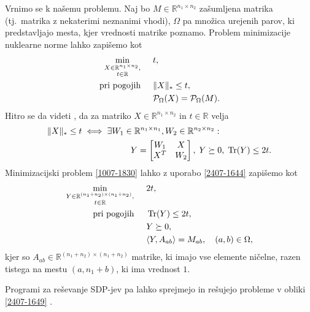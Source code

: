 Vrnimo se k našemu problemu. Naj bo $M \in \mathbb{R}^{n_1 \times n_2}$ zašumljena matrika (tj.\ matrika z nekaterimi neznanimi vhodi), $\Omega$ pa množica urejenih parov, ki predstavljajo mesta, kjer vrednosti matrike poznamo.
Problem minimizacije nuklearne norme lahko zapišemo kot
\begin{align}
\label{1007-1830}
\begin{split}
    \min_{\substack{X\in \mathbb R^{n_1\times n_2},\\ t\in \mathbb R}} \hspace{0.5cm}        & t,                                               \\
    \text{pri pogojih} \hspace{0.5cm} & \lVert X\rVert_* \leq t,  \\
                                      & \mathcal{P}_\Omega(X) = \mathcal{P}_\Omega(M).
\end{split}
\end{align}
Hitro se da videti \cite[lema 2]{NNM-PHD}, da za matriko $X \in \mathbb{R}^{n_1 \times n_2}$ in $t \in \mathbb{R}$
velja 
\begin{align}
\label{2407-1644}
\begin{split}
\lVert X\rVert_* \leq t &\iff \exists W_1\in \mathbb{R}^{n_1 \times n_1}, W_2 \in \mathbb{R}^{n_2 \times n_2}:\\
&\hspace{2cm}
Y = \begin{bmatrix}
               W_1 & X                     \\
               X^T & W_2 
           \end{bmatrix},\;       Y \succeq 0,\; \operatorname{Tr}(Y) \leq 2t.
\end{split}
\end{align}
Minimizacijski problem \eqref{1007-1830} lahko z uporabo \eqref{2407-1644} zapišemo kot
\begin{align}
\label{2407-1649}
\begin{split}
    \min_{\substack{Y\in \mathbb R^{(n_1+n_2)\times (n_1+n_2)},\\ t\in \mathbb R}}     \hspace{0.5cm} & 2t,                        \\
    \text{pri pogojih} \hspace{0.5cm} & \operatorname{Tr}(Y) \leq 2t,           \\
                                  & Y \succeq 0,              \\
                                  & \langle Y, A_{ab} \rangle = M_{ab},\quad (a,b)\in \Omega,
\end{split}
\end{align}
kjer so $A_{ab} \in \mathbb{R}^{(n_1 + n_2) \times (n_1 + n_2)}$ matrike, ki imajo vse elemente ničelne, razen tistega na mestu $(a, n_1 + b)$, ki ima vrednost $1$.
\iffalse
Ker velja
\[
    \trOp{A}{B} = \sum_{i}^{n_1} \sum_{j}^{n_2} a_{ij}b_{ij}
\] je lahko videti, da je tak pogoj smiselen. 
\fi
Programi za reševanje SDP-jev pa lahko sprejmejo in rešujejo probleme v obliki \eqref{2407-1649}
\cite{Survey-NKS19}.
 

